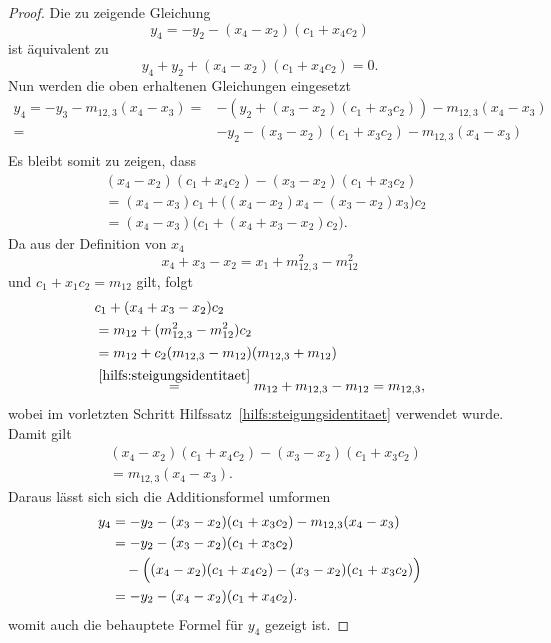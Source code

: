 \begin{proof}
    Die zu zeigende Gleichung
    \[
        y_4=-y_2-(x_4-x_2)(c_1+x_4c_2)
    \]
    ist äquivalent zu
    \[
        y_4+y_2+(x_4-x_2)(c_1+x_4c_2)=0.
    \]
    Nun werden die oben erhaltenen Gleichungen eingesetzt
    \begin{align*}
        y_4=-y_3-m_{12,3}(x_4-x_3) = & -(y_2+(x_3-x_2)(c_1+x_3c_2))-m_{12,3}(x_4-x_3) \\
        =                            & -y_2-(x_3-x_2)(c_1+x_3c_2)-m_{12,3}(x_4-x_3)   \\
    \end{align*}
    Es bleibt somit zu zeigen, dass
    \[
        \begin{aligned}
             & (x_4-x_2)(c_1+x_4c_2)
            -(x_3-x_2)(c_1+x_3c_2)                         \\
             & =(x_4-x_3)c_1
            +\bigl((x_4-x_2)x_4-(x_3-x_2)x_3\bigr)c_2      \\
             & =(x_4-x_3)\bigl(c_1+(x_4+x_3-x_2)c_2\bigr).
        \end{aligned}
    \]
    Da aus der Definition von $x_4$
    \[
        x_4+x_3-x_2
        =x_1+m_{12,3}^2-m_{12}^2
    \]
    und $c_1+x_1c_2=m_{12}$ gilt, folgt
    \[
        \begin{aligned}
             & c_1+(x_4+x_3-x_2)c_2                                               \\
             & =m_{12}+(m_{12,3}^2-m_{12}^2)c_2                                   \\
             & =m_{12}
            +c_2(m_{12,3}-m_{12})(m_{12,3}+m_{12})                                \\
             & \overset{\ref{hilfs:steigungsidentitaet}}{=}m_{12}+m_{12,3}-m_{12}
            =m_{12,3},
        \end{aligned}
    \]
    wobei im vorletzten Schritt
    Hilfssatz~\ref{hilfs:steigungsidentitaet} verwendet wurde. Damit gilt
    \[
        \begin{aligned}
             & (x_4-x_2)(c_1+x_4c_2)
            -(x_3-x_2)(c_1+x_3c_2)   \\
             & =m_{12,3}(x_4-x_3).
        \end{aligned}
    \]
    Daraus lässt sich sich die Additionsformel umformen
    \begin{align*}
        y_4
         & = -y_2-(x_3-x_2)(c_1+x_3c_2)
        -m_{12,3}(x_4-x_3)               \\
         & = -y_2-(x_3-x_2)(c_1+x_3c_2)  \\
         & \quad
        -\Bigl((x_4-x_2)(c_1+x_4c_2)
        -(x_3-x_2)(c_1+x_3c_2)\Bigr)     \\
         & = -y_2-(x_4-x_2)(c_1+x_4c_2).
    \end{align*}
    womit auch die behauptete Formel für $y_4$ gezeigt ist.
\end{proof}

